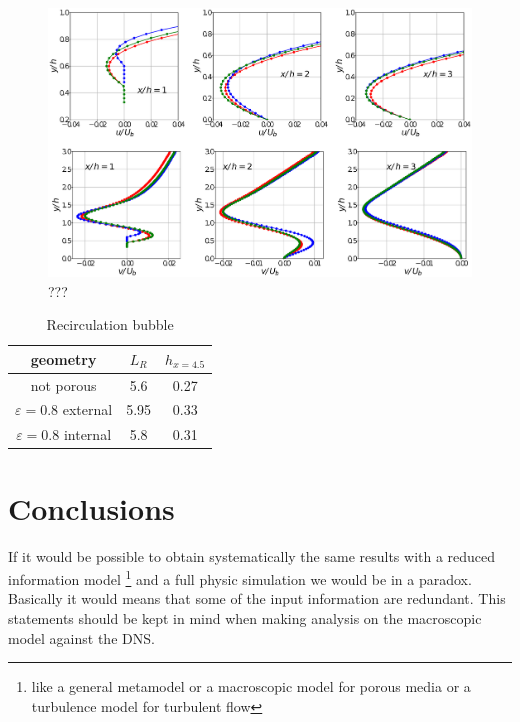 \begin{figure}[h]
	\centering
	\includegraphics[width=1\linewidth]{chapter_5/figure/cuts_hill}
	\caption{???}
	\label{fig:cuts_hill}
\end{figure}

\begin{table}
\centering
\begin{tabular}{c|c|c}
	geometry & $L_R$ & $h_{x=4.5}$ \\ 
	\hline 
	\hline 
	not porous & 5.6 & 0.27 \\ 
	\hline 
	$\varepsilon=0.8$ external & 5.95 & 0.33 \\ 
	\hline 
	$\varepsilon=0.8$ internal & 5.8 & 0.31 \\ 
	\hline 
	\hline 
\end{tabular}
\caption{Recirculation bubble }
\label{tb:table}
\end{table}

\section{Conclusions}

If it would be possible to obtain systematically the same results with a reduced information model \footnote{like a general metamodel or a macroscopic model for porous media or a turbulence model for turbulent flow} and a full physic simulation we would be in a paradox. Basically it would means that some of the input information are redundant. This statements should be kept in mind when making analysis on the macroscopic model against the DNS.


